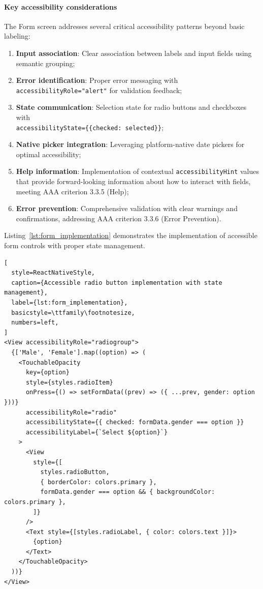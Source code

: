 \paragraph{Key accessibility considerations}

The Form screen addresses several critical accessibility patterns beyond basic labeling:

\begin{enumerate}
    \item \textbf{Input association}: Clear association between labels and input fields using semantic grouping;
    
    \item \textbf{Error identification}: Proper error messaging with \texttt{accessibilityRole="alert"} for validation feedback;
    
    \item \textbf{State communication}: Selection state for radio buttons and checkboxes with \\ \texttt{accessibilityState=\{\{checked: selected\}\}};
    
    \item \textbf{Native picker integration}: Leveraging platform-native date pickers for optimal accessibility;
    
    \item \textbf{Help information}: Implementation of contextual \texttt{accessibilityHint} values that provide forward-looking information about how to interact with fields, meeting AAA criterion 3.3.5 (Help);
    
    \item \textbf{Error prevention}: Comprehensive validation with clear warnings and confirmations, addressing AAA criterion 3.3.6 (Error Prevention).
\end{enumerate}

Listing~\ref{lst:form_implementation} demonstrates the implementation of accessible form controls with proper state management.

\begin{lstlisting}[
  style=ReactNativeStyle,
  caption={Accessible radio button implementation with state management},
  label={lst:form_implementation},
  basicstyle=\ttfamily\footnotesize,
  numbers=left,
]
<View accessibilityRole="radiogroup">
  {['Male', 'Female'].map((option) => (
    <TouchableOpacity
      key={option}
      style={styles.radioItem}
      onPress={() => setFormData((prev) => ({ ...prev, gender: option }))}
      accessibilityRole="radio"
      accessibilityState={{ checked: formData.gender === option }}
      accessibilityLabel={`Select ${option}`}
    >
      <View
        style={[
          styles.radioButton,
          { borderColor: colors.primary },
          formData.gender === option && { backgroundColor: colors.primary },
        ]}
      />
      <Text style={[styles.radioLabel, { color: colors.text }]}>
        {option}
      </Text>
    </TouchableOpacity>
  ))}
</View>
\end{lstlisting}
\FloatBarrier

